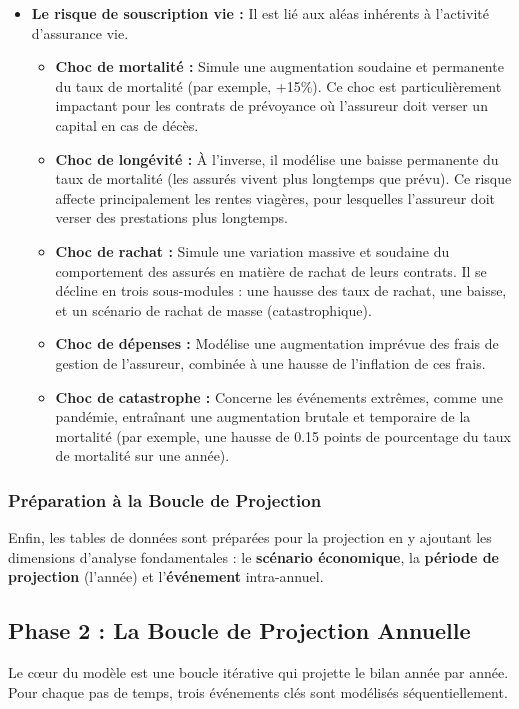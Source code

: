 \begin{itemize}
\item \textbf{Le risque de souscription vie :} Il est lié aux aléas inhérents à l'activité d'assurance vie.
\begin{itemize}
\item \textbf{Choc de mortalité :} Simule une augmentation soudaine et permanente du taux de mortalité (par exemple, +15\%). Ce choc est particulièrement impactant pour les contrats de prévoyance où l'assureur doit verser un capital en cas de décès.
\item \textbf{Choc de longévité :} À l'inverse, il modélise une baisse permanente du taux de mortalité (les assurés vivent plus longtemps que prévu). Ce risque affecte principalement les rentes viagères, pour lesquelles l'assureur doit verser des prestations plus longtemps.
\item \textbf{Choc de rachat :} Simule une variation massive et soudaine du comportement des assurés en matière de rachat de leurs contrats. Il se décline en trois sous-modules : une hausse des taux de rachat, une baisse, et un scénario de rachat de masse (catastrophique).
\item \textbf{Choc de dépenses :} Modélise une augmentation imprévue des frais de gestion de l'assureur, combinée à une hausse de l'inflation de ces frais.
\item \textbf{Choc de catastrophe :} Concerne les événements extrêmes, comme une pandémie, entraînant une augmentation brutale et temporaire de la mortalité (par exemple, une hausse de 0.15 points de pourcentage du taux de mortalité sur une année).
\end{itemize}

\end{itemize}

\subsubsection{Préparation à la Boucle de Projection}

Enfin, les tables de données sont préparées pour la projection en y ajoutant les dimensions d'analyse fondamentales : le \textbf{scénario économique}, la \textbf{période de projection} (l'année) et l'\textbf{événement} intra-annuel.

\subsection{Phase 2 : La Boucle de Projection Annuelle}

Le cœur du modèle est une boucle itérative qui projette le bilan année par année. Pour chaque pas de temps, trois événements clés sont modélisés séquentiellement.

